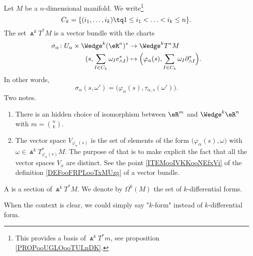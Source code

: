 \begin{propositionDef}		\label{DEFooZELVooFfosEn}
	Let \( M\) be a \( n\)-dimensional manifold. We write\footnote{This provides a basis of \( \Wedge^kT^*m\), see proposition \ref{PROPooUGLOooTULnDK}.}
	\begin{equation}
		C_k=\{ (i_1,\ldots,i_k)\tq 1\leq i_1<\ldots <i_k\leq n \}.
	\end{equation}
	The set \( \Wedge^kT^*M\) is a vector bundle with the charts
	\begin{equation}		\label{EQooOMWMooKKWhqf}
		\begin{aligned}
			\sigma_{\alpha}\colon U_{\alpha}\times \Wedge^k(\eR^n)^* & \to \Wedge^kT^*M                                                                       \\
			(s,\sum_{I\in C_k}\omega_Ie^*_{\wedge I})                & \mapsto \Big( \varphi_{\alpha}(s),  \sum_{I\in C_k}\omega_I\partial^*_{\wedge I}\Big).
		\end{aligned}
	\end{equation}
	In other words,
	\begin{equation}
		\sigma_{\alpha}(s,\omega')=\big( \varphi_{\alpha}(s),\tau_{\alpha,s}(\omega') \big).
	\end{equation}
	Two notes.
	\begin{enumerate}
		\item
		      There is an hidden choice of isomorphism between \( \eR^m\) and \( \Wedge^k\eR^n\) with \( m=\binom{ n }{ k }\).
		\item
		      The vector space \( V_{\varphi_{\alpha}(s)}\) is the set of elements of the form \( \big( \varphi_{\alpha}(s),\omega \big)\) with \( \omega\in \Wedge^kT^*_{\varphi_{\alpha}(s)}M\). The purpose of that is to make explicit the fact that all the vector spaces \( V_x\) are distinct. See the point \ref{ITEMooIVKKooNEfxVi} of the definition \ref{DEFooFRPLooTxMUzg} of a vector bundle.
	\end{enumerate}
\end{propositionDef}

\noproof

\begin{definition}		\label{DEFooBRSSooWOgoov}
	A  is a section of \( \Wedge^kT^*M\). We denote by \( \Omega^k(M)\) the set of \( k\)-differential forms.

	When the context is clear, we could simply say "\( k\)-form" instead of \( k\)-differential form.
\end{definition}

